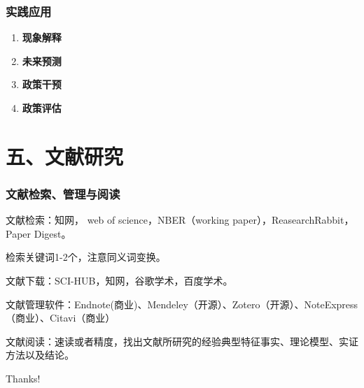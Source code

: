 \documentclass[aspectratio=169, 12pt]{beamer}
\begin{document}
\begin{frame}[plain]
    \frametitle{实践应用} 
    \begin{enumerate}
        \item \textbf{现象解释}
        \item \textbf{未来预测}
        \item \textbf{政策干预}
        \item \textbf{政策评估}
    \end{enumerate}
\end{frame}

\section{五、文献研究}

\begin{frame}[plain]
    \frametitle{文献检索、管理与阅读}
    文献检索：知网， web of science，NBER（working paper），ReasearchRabbit，Paper Digest。
    \par
    检索关键词1-2个，注意同义词变换。
    \par
    文献下载：SCI-HUB，知网，谷歌学术，百度学术。
    \par
    文献管理软件：Endnote(商业)、Mendeley（开源）、Zotero（开源）、NoteExpress（商业）、Citavi（商业）
    \par
    文献阅读：速读或者精度，找出文献所研究的经验典型特征事实、理论模型、实证方法以及结论。
\end{frame}

\begin{frame}[standout]
    \begin{center}
        {\Huge\calligra Thanks!}
      \end{center}
\end{frame}
\end{document}
